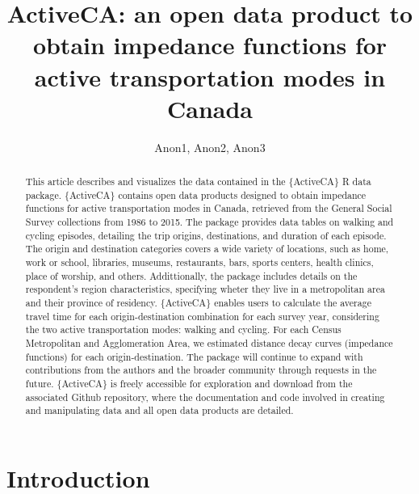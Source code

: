 \documentclass[Royal,times,sageh]{sagej}
\begin{document}

\title{ActiveCA: an open data product to obtain impedance functions for
active transportation modes in Canada}

\runninghead{}

\author{Anon1\affilnum{}, Anon2\affilnum{}, Anon3\affilnum{}}

\affiliation{\affilnum{}{}}



\begin{abstract}
This article describes and visualizes the data contained in the
\{ActiveCA\} R data package. \{ActiveCA\} contains open data products
designed to obtain impedance functions for active transportation modes
in Canada, retrieved from the General Social Survey collections from
1986 to 2015. The package provides data tables on walking and cycling
episodes, detailing the trip origins, destinations, and duration of each
episode. The origin and destination categories covers a wide variety of
locations, such as home, work or school, libraries, museums,
restaurants, bars, sports centers, health clinics, place of worship, and
others. Addittionally, the package includes details on the respondent's
region characteristics, specifying wheter they live in a metropolitan
area and their province of residency. \{ActiveCA\} enables users to
calculate the average travel time for each origin-destination
combination for each survey year, considering the two active
transportation modes: walking and cycling. For each Census Metropolitan
and Agglomeration Area, we estimated distance decay curves (impedance
functions) for each origin-destination. The package will continue to
expand with contributions from the authors and the broader community
through requests in the future. \{ActiveCA\} is freely accessible for
exploration and download from the associated Github repository, where
the documentation and code involved in creating and manipulating data
and all open data products are detailed.
\end{abstract}


\maketitle

\hypertarget{introduction}{%
\section{Introduction}\label{introduction}}
\end{document}
